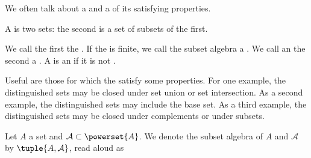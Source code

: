 
\sbasic



\sstart



We often talk about a  and
a  of its 
satisfying properties.


A  is two
sets: the second is a set of subsets of the
first.

We call the first  the
.
If the  is finite,
we call the subset algebra a
.
We call an  the second
 a .
A  is an
if it is not .

Useful  are those for
which the 
satisfy some 
properties.
For one example, the distinguished sets may be closed under set union or
set intersection.
As a second example, the distinguished sets may include the base
set.
As a third example, the distinguished sets may be closed under
complements or under subsets.


Let $A$ a set and $\mathcal{A} \subset \powerset{A}$.
We denote the subset algebra of $A$ and $\mathcal{A}$
by $\tuple{A, \mathcal{A}}$, read aloud as 

\strats
